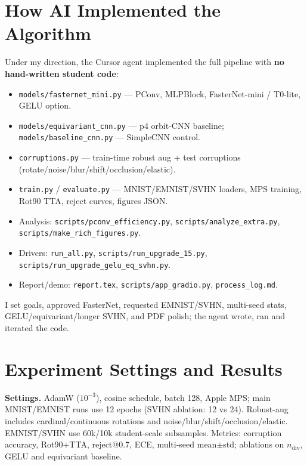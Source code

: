 \documentclass[11pt,a4paper]{article}
\begin{document}
\section{How AI Implemented the Algorithm}
Under my direction, the Cursor agent implemented the full pipeline with \textbf{no hand-written student code}:
\begin{itemize}
  \item \texttt{models/fasternet\_mini.py} --- PConv, MLPBlock, FasterNet-mini / T0-lite, GELU option.
  \item \texttt{models/equivariant\_cnn.py} --- p4 orbit-CNN baseline; \texttt{models/baseline\_cnn.py} --- SimpleCNN control.
  \item \texttt{corruptions.py} --- train-time robust aug + test corruptions (rotate/noise/blur/shift/occlusion/elastic).
  \item \texttt{train.py} / \texttt{evaluate.py} --- MNIST/EMNIST/SVHN loaders, MPS training, Rot90 TTA, reject curves, figures JSON.
  \item Analysis: \texttt{scripts/pconv\_efficiency.py}, \texttt{scripts/analyze\_extra.py}, \texttt{scripts/make\_rich\_figures.py}.
  \item Drivers: \texttt{run\_all.py}, \texttt{scripts/run\_upgrade\_15.py}, \texttt{scripts/run\_upgrade\_gelu\_eq\_svhn.py}.
  \item Report/demo: \texttt{report.tex}, \texttt{scripts/app\_gradio.py}, \texttt{process\_log.md}.
\end{itemize}
I set goals, approved FasterNet, requested EMNIST/SVHN, multi-seed stats, GELU/equivariant/longer SVHN, and PDF polish; the agent wrote, ran and iterated the code.

\section{Experiment Settings and Results}
\textbf{Settings.} AdamW ($10^{-3}$), cosine schedule, batch 128, Apple MPS; main MNIST/EMNIST runs use 12 epochs (SVHN ablation: 12 vs 24). Robust-aug includes cardinal/continuous rotations and noise/blur/shift/occlusion/elastic. EMNIST/SVHN use 60k/10k student-scale subsamples. Metrics: corruption accuracy, Rot90+TTA, reject@0.7, ECE, multi-seed mean$\pm$std; ablations on $n_{\mathrm{div}}$, GELU and equivariant baseline.
\end{document}
